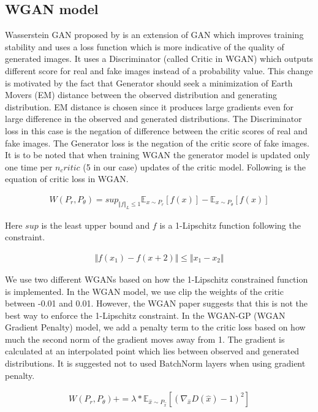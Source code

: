\documentclass[10pt,journal,compsoc]{IEEEtran}
\begin{document}
\subsection{WGAN model}

Wasserstein GAN proposed by \cite{Arjovsky2017} is an extension of GAN which improves training stability and uses a loss function which is more indicative of the quality
of generated images. It uses a Discriminator (called Critic in WGAN) which outputs different score for real and fake images instead of a probability value. This change
is motivated by the fact that Generator should seek a minimization of Earth Movers (EM) distance between the observed distribution and generating distribution. EM distance
is chosen since it produces large gradients even for large difference in the observed and generated distributions. The Discriminator loss in this case is the negation of 
difference between the critic scores of real and fake images. The Generator loss is the negation of the critic score of fake images. It is to be noted that when training 
WGAN the generator model is updated only one time per $n_critic$ (5 in our case) updates of the critic model. Following is the equation of critic loss in WGAN. 

\begin{align}
  W(P_r, P_{\theta}) = sup_{\Vert f \Vert_{L} \leq 1} \mathbb{E}_{x \sim P_r} [f(x)] - \mathbb{E}_{x \sim P_{\theta}} [f(x)]
\end{align}

Here $sup$ is the least upper bound and $f$ is a 1-Lipschitz function following the constraint.

\begin{align}
  \Vert f(x_1) - f(x+2) \Vert \leq \Vert x_1 -x_2 \Vert
\end{align}

We use two different WGANs based on how the 1-Lipschitz constrained function is implemented. In the WGAN model, we use clip the weights of the critic between -0.01 and 0.01.
However, the WGAN paper suggests that this is not the best way to enforce the 1-Lipschitz constraint. In the WGAN-GP (WGAN Gradient Penalty) model, we add a penalty term to
the critic loss based on how much the second norm of the gradient moves away from 1. The gradient is calculated at an interpolated point which lies between observed and
generated distributions. It is suggested not to used BatchNorm layers when using gradient penalty.

\begin{align}
  W(P_r, P_{\theta}) += \lambda * \mathbb{E}_{\hat{x} \sim P_{\hat{x}}} [(\nabla_{\hat{x}} D(\hat{x}) - 1)^2]
\end{align}
\end{document}
